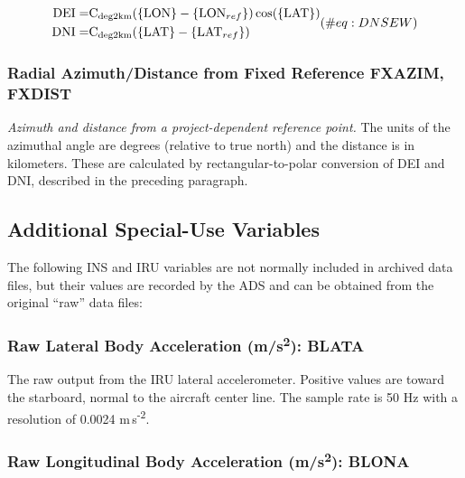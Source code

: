 \documentclass[
  english,
]{book}
\begin{document}
\begin{equation}
\begin{split}
\mathrm{DEI} = & \mathrm{C_{deg2km}}(\mathrm{\{LON\}}-\{\mathrm{LON}_{ref}\})\cos(\mathrm{\{LAT\}}) \notag \\ 
\mathrm{DNI} = & \mathrm{C_{deg2km}}(\mathrm{\{LAT\}}-\{\mathrm{LAT}_{ref}\})  
\end{split}
(\#eq:DNSEW)
\end{equation}

\hypertarget{fxaxim}{%
\subsubsection*{Radial Azimuth/Distance from Fixed Reference FXAZIM,
FXDIST}\label{fxaxim}}

\emph{Azimuth and distance from a project-dependent reference point.}
The units of the azimuthal angle are degrees (relative to true north)
and the distance is in kilometers. These are calculated by
rectangular-to-polar conversion of DEI and DNI, described in the
preceding paragraph.

\hypertarget{special-use-irs}{%
\subsection{Additional Special-Use Variables}\label{special-use-irs}}

The following INS and IRU variables are not normally included in
archived data files, but their values are recorded by the ADS and can be
obtained from the original ``raw'' data files:

\hypertarget{blata}{%
\subsubsection*{\texorpdfstring{Raw Lateral Body Acceleration
(m/s\textsuperscript{2}):
BLATA}{Raw Lateral Body Acceleration (m/s2): BLATA}}\label{blata}}

The raw output from the IRU lateral accelerometer. Positive values are
toward the starboard, normal to the aircraft center line. The sample
rate is 50 Hz with a resolution of 0.0024 m s\textsuperscript{-2}.

\hypertarget{blona}{%
\subsubsection*{\texorpdfstring{Raw Longitudinal Body Acceleration
(m/s\textsuperscript{2}):
BLONA}{Raw Longitudinal Body Acceleration (m/s2): BLONA}}\label{blona}}
\end{document}
